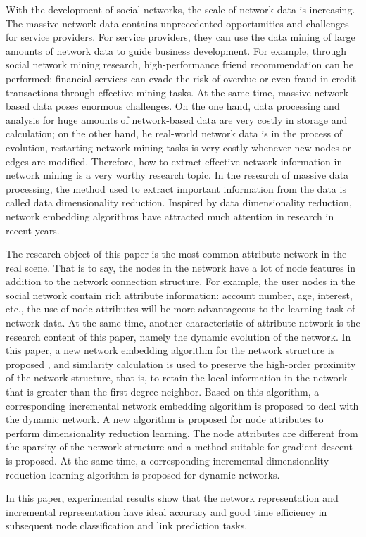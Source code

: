 With the development of social networks, the scale of network data is increasing. The massive network data contains unprecedented opportunities and challenges for service providers. For service providers, they can use the data mining of large amounts of network data to guide business development. For example, through social network mining research, high-performance friend recommendation can be performed; financial services  can evade the risk of overdue or even fraud in credit transactions  through effective mining tasks. At the same time, massive network-based data poses enormous challenges. On the one hand, data processing and analysis for huge amounts of network-based data are very costly in storage and calculation; on the other hand, he real-world network data is in the process of evolution,  restarting network mining tasks is very costly whenever new nodes or edges are modified. Therefore, how to extract effective network information in network mining is a very worthy research topic. In the research of massive data processing, the method used to extract important information from the data is called data dimensionality reduction. Inspired by data dimensionality reduction, network embedding algorithms have attracted much attention in research in recent years.

The research object of this paper is the most common attribute network in the real scene. That is to say, the nodes in the network have a lot of node features in addition to the network connection structure. For example, the user nodes in the social network contain rich attribute information: account number, age, interest,  etc., the use of node attributes will be more advantageous to the learning task of network data. At the same time, another characteristic of attribute network is the research content of this paper, namely the dynamic evolution of the network. In this paper, a new network embedding algorithm for the network structure is proposed , and similarity calculation is used to preserve the high-order proximity of the network structure, that is, to retain the local information in the network that is greater than the first-degree neighbor. Based on this algorithm, a corresponding incremental network embedding algorithm is proposed to deal with the dynamic network. A new algorithm is proposed for node attributes to perform dimensionality reduction learning. The node attributes are different from the sparsity of the network structure and a method suitable for gradient descent is proposed.  At the same time, a corresponding incremental dimensionality reduction learning algorithm is proposed for dynamic networks.

In this paper, experimental results show that the network representation and incremental representation have ideal accuracy and good time efficiency in subsequent node classification and link prediction tasks.
